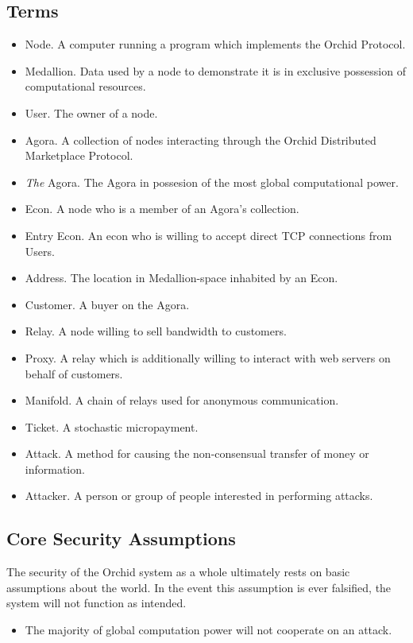 \documentclass{article}
\newcommand{\orchid}{Orchid}
\newcommand{\Orchid}{\orchid}
\begin{document}
\subsection{Terms}

\begin{itemize}
\item Node. A computer running a program which implements the \Orchid{} Protocol.
\item Medallion. Data used by a node to demonstrate it is in exclusive possession of computational resources.
\item User. The owner of a node.
\item Agora. A collection of nodes interacting through the \Orchid{} Distributed Marketplace Protocol.
\item \emph{The} Agora. The Agora in possesion of the most global computational power.
\item Econ. A node who is a member of an Agora's collection.
\item Entry Econ. An econ who is willing to accept direct TCP connections from Users.
\item Address. The location in Medallion-space inhabited by an Econ.
\item Customer. A buyer on the Agora.
\item Relay. A node willing to sell bandwidth to customers.
\item Proxy. A relay which is additionally willing to interact with web servers on behalf of customers.
\item Manifold. A chain of relays used for anonymous communication.
\item Ticket. A stochastic micropayment.
\item Attack. A method for causing the non-consensual transfer of money or information.
\item Attacker. A person or group of people interested in performing attacks.
\end{itemize}

\subsection{Core Security Assumptions}
\label{core-security}

The security of the \Orchid{} system as a whole ultimately rests on basic assumptions about the world. In the event this assumption is ever falsified, the system will not function as intended.

\begin{itemize}
\item The majority of global computation power will not cooperate on an attack.
\end{itemize}
\end{document}
